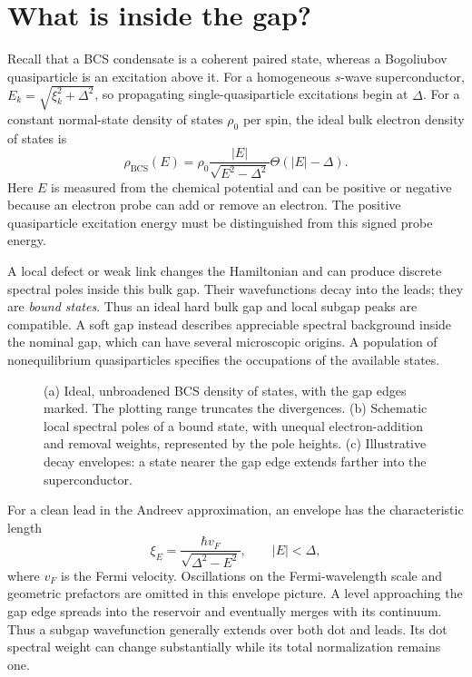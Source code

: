 \section{What is inside the gap?}\label{sec:gap-picture}

Recall that a BCS condensate is a coherent paired state, whereas a Bogoliubov
quasiparticle is an excitation above it. For a homogeneous $s$-wave superconductor,
$E_k=\sqrt{\xi_k^2+\Delta^2}$, so propagating single-quasiparticle excitations
begin at $\Delta$. For a constant normal-state density of states $\rho_0$
per spin, the ideal bulk electron density of states is
\begin{equation}\label{eq:primer-dos}
 \rho_{\mathrm{BCS}}(E)=\rho_0\frac{|E|}{\sqrt{E^2-\Delta^2}}
 \Theta(|E|-\Delta).
\end{equation}
Here $E$ is measured from the chemical potential and can be positive or negative
because an electron probe can add or remove an electron. The positive
quasiparticle excitation energy must be distinguished from this signed probe
energy.

A local defect or weak link changes the Hamiltonian and can produce discrete
spectral poles inside this bulk gap. Their wavefunctions decay into the leads;
they are \emph{bound states}. Thus an ideal hard bulk gap and local subgap peaks
are compatible. A soft gap instead describes appreciable spectral background
inside the nominal gap, which can have several microscopic origins. A population
of nonequilibrium quasiparticles specifies the occupations of the available states.

\begin{figure}[htb]
\centering{}
\caption{(a) Ideal, unbroadened BCS density of states, with the gap edges marked.
The plotting range truncates the divergences.
(b) Schematic local spectral poles of a bound state, with unequal electron-addition
and removal weights, represented by the pole heights.
(c) Illustrative decay envelopes: a state nearer the gap edge
extends farther into the superconductor.}
\label{fig:primer-gap}
\end{figure}

For a clean lead in the Andreev approximation, an envelope has the characteristic
length
\begin{equation}
 \xi_E=\frac{\hbar v_F}{\sqrt{\Delta^2-E^2}},\qquad |E|<\Delta,
\end{equation}
where $v_F$ is the Fermi velocity. Oscillations on the Fermi-wavelength scale and
geometric prefactors are omitted in this envelope picture. A level approaching
the gap edge spreads into the reservoir and eventually merges with its continuum.
Thus a subgap wavefunction generally extends over both dot and leads. Its dot spectral
weight can change substantially while its total
normalization remains one.

